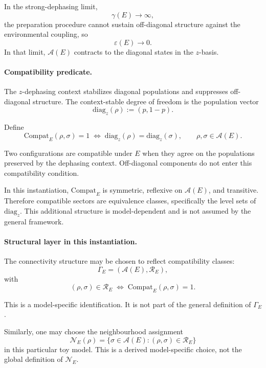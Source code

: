\documentclass[aps,prx,onecolumn,11pt]{revtex4-2}
\theoremstyle{plain}
\theoremstyle{definition}
\theoremstyle{remark}
\begin{document}
In the strong-dephasing limit,
\[
\gamma(E)\to\infty,
\]
the preparation procedure cannot sustain off-diagonal structure against
the environmental coupling, so
\[
\varepsilon(E)\to 0.
\]
In that limit, \(\mathcal A(E)\) contracts to the diagonal states in the
\(z\)-basis.

\paragraph{Compatibility predicate.}

The \(z\)-dephasing context stabilizes diagonal populations and
suppresses off-diagonal structure. The context-stable degree of freedom
is the population vector
\[
\mathrm{diag}_z(\rho):=(p,1-p).
\]

Define
\begin{equation}
\mathrm{Compat}_E(\rho,\sigma)=1
\;\Longleftrightarrow\;
\mathrm{diag}_z(\rho)
=
\mathrm{diag}_z(\sigma),
\qquad
\rho,\sigma\in\mathcal A(E).
\label{eq:zdephasing_compat}
\end{equation}

Two configurations are compatible under \(E\) when they agree on the
populations preserved by the dephasing context. Off-diagonal components
do not enter this compatibility condition.

In this instantiation, \(\mathrm{Compat}_E\) is symmetric, reflexive on
\(\mathcal A(E)\), and transitive. Therefore compatible sectors are
equivalence classes, specifically the level sets of
\(\mathrm{diag}_z\). This additional structure is model-dependent and
is not assumed by the general framework.

\paragraph{Structural layer in this instantiation.}

The connectivity structure may be chosen to reflect compatibility
classes:
\[
\Gamma_E
=
(\mathcal A(E),\mathcal R_E),
\]
with
\begin{equation}
(\rho,\sigma)\in\mathcal R_E
\;\Longleftrightarrow\;
\mathrm{Compat}_E(\rho,\sigma)=1.
\label{eq:zdephasing_connectivity}
\end{equation}

This is a model-specific identification. It is not part of the general
definition of \(\Gamma_E\).

Similarly, one may choose the neighbourhood assignment
\[
\mathcal N_E(\rho)
=
\{\sigma\in\mathcal A(E):
(\rho,\sigma)\in\mathcal R_E\}
\]
in this particular toy model. This is a derived model-specific choice,
not the global definition of \(\mathcal N_E\).
\end{document}
